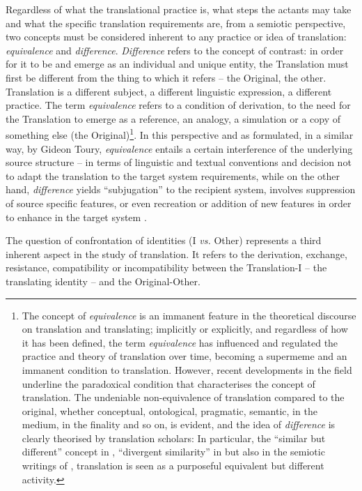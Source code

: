 \documentclass[output=paper]{LSP/langsci}
\begin{document}
\largerpage
Regardless of what the translational practice is, what steps the actants may take and what the specific translation requirements are, from a semiotic perspective, two concepts must be considered inherent to any practice or idea of translation: \textit{equivalence} and \textit{difference}. \textit{Difference} refers to the concept of contrast: in order for it to be and emerge as an individual and unique entity, the Translation must first be different from the thing to which it refers -- the Original, the other. Translation is a different subject, a different linguistic expression, a different practice. The term \textit{equivalence} refers to a condition of derivation, to the need for the Translation to emerge as a reference, an analogy, a simulation or a copy of something else (the Original)\footnote{The concept of \textit{equivalence} is an immanent feature in the theoretical discourse on translation and translating; implicitly or explicitly, and regardless of how it has been defined, the term \textit{equivalence} has influenced and regulated the practice and theory of translation over time, becoming a supermeme \citep{Chesterman1997} and an immanent condition to translation. However, recent developments in the field underline the paradoxical condition that characterises the concept of translation. The undeniable non-equivalence of translation compared to the original, whether conceptual, ontological, pragmatic, semantic, in the medium, in the finality and so on, is evident, and the idea of \textit{difference} is clearly theorised by translation scholars: In particular, the ``similar but different'' concept in \citet{Nida2004}, ``divergent similarity'' in \citet{Chesterman1996} but also in the semiotic writings of \citet{Stecconi2004, Gorlee1994, Petrilli1992}, translation is seen as a purposeful equivalent but different activity.}. In this perspective and as formulated, in a similar way, by Gideon Toury, \textit{equivalence} entails a certain interference of the underlying source structure -- in terms of linguistic and textual conventions and decision not to adapt the translation to the target system requirements, while on the other hand, \textit{difference} yields ``subjugation'' to the recipient system, involves suppression of source specific features, or even recreation or addition of new features in order to enhance  in the target system \citep[171]{Toury1995}.

The question of confrontation of identities (I \textit{vs.} Other) represents a third inherent aspect in the study of translation. It refers to the derivation, exchange, resistance, compatibility or incompatibility between the Translation-I -- the translating identity -- and the Original-Other. 
\end{document}
